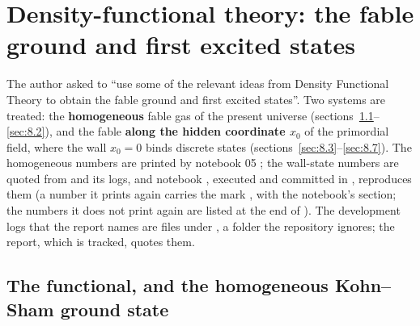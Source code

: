 \section{Density-functional theory: the fable ground and first excited states}
\label{sec:8}

The author asked to ``use some of the relevant ideas from Density Functional Theory to obtain the fable
ground and first excited states''. Two systems are treated: the \textbf{homogeneous} fable gas of the
present universe (sections~\ref{sec:8.1}--\ref{sec:8.2}), and the fable \textbf{along the hidden
coordinate $x_0$} of the primordial field, where the wall $x_0=0$ binds discrete states
(sections~\ref{sec:8.3}--\ref{sec:8.7}). The homogeneous numbers are printed by notebook 05
; the wall-state numbers are quoted from
  and its logs, and notebook
, executed and committed in , reproduces them (a number
it prints again carries the mark , with the notebook's section; the numbers it does not
print again are listed at the end of ). The development logs that the report names are files under
, a folder the repository ignores; the report, which is tracked, quotes
them.

\subsection{The functional, and the homogeneous Kohn--Sham ground state}
\label{sec:8.1}

